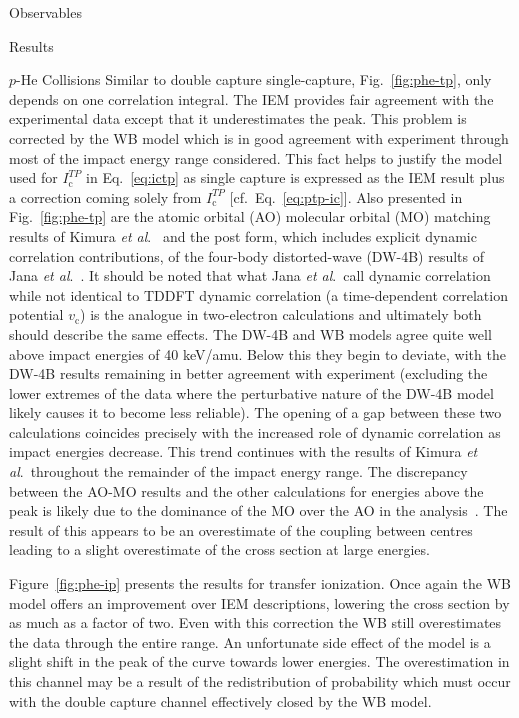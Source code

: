 \documentclass[letterpaper, 11 pt]{report}
\begin{document}
\begin{chapter}{Observables \label{chap:p-he2p-he}}
\begin{section}{Results \label{sec:phe2p-res}}
\begin{subsection}{\texorpdfstring{$p$}{p}-He Collisions \label{sec:phe-res}}
         Similar to double capture single-capture, Fig.~\ref{fig:phe-tp}, only depends on one
         correlation integral. The IEM provides fair agreement with the experimental data except that it
         underestimates the peak. This problem is corrected by the WB model which is in good agreement
         with experiment through most of the impact energy range considered. This fact helps to justify
         the model used for $I^{TP}_\mathrm{c}$ in Eq.\ \eqref{eq:ictp} as single capture is expressed
         as the IEM result plus a correction coming solely from $I^{TP}_\mathrm{c}$
         [cf.\ Eq.~\eqref{eq:ptp-ic}]. Also presented in Fig.~\ref{fig:phe-tp} are the atomic orbital
         (AO) molecular orbital (MO) matching results of Kimura \textit{et al}.~\cite{KL-86} and the
         post form, which includes explicit dynamic correlation contributions, of the four-body
         distorted-wave (DW-4B) results of Jana \textit{et al}.~\cite{JMP-15}. It should be noted that
         what Jana \textit{et al}.\ call dynamic correlation while not identical to TDDFT dynamic
         correlation (a time-dependent correlation potential $v_\mathrm{c}$) is the analogue in
         two-electron calculations and ultimately both should describe the same effects. The DW-4B and
         WB models agree quite well above impact energies of 40 keV/amu. Below this they begin to
         deviate, with the DW-4B results remaining in better agreement with experiment (excluding the
         lower extremes of the data where the perturbative nature of the DW-4B model likely causes it to
         become less reliable). The opening of a gap between these two calculations coincides precisely
         with the increased role of dynamic correlation as impact energies decrease. This trend
         continues with the results of Kimura \textit{et al}.\ throughout the remainder of the impact
         energy range. The discrepancy between the AO-MO results and the other calculations for energies
         above the peak is likely due to the dominance of the MO over the AO in the
         analysis~\cite{KL-86}. The result of this appears to be an overestimate of the coupling between
         centres leading to a slight overestimate of the cross section at large energies.

         Figure~\ref{fig:phe-ip} presents the results for transfer ionization. Once again the WB model
         offers an improvement over IEM descriptions, lowering the cross section by as much as a factor
         of two. Even with this correction the WB still overestimates the data through the entire range.
         An unfortunate side effect of the model is a slight shift in the peak of the curve towards
         lower energies. The overestimation in this channel may be a result of the redistribution of
         probability which must occur with the double capture channel effectively closed by the WB
         model.
         

\end{subsection}
\end{section}
\end{chapter}
\end{document}
